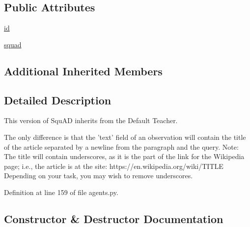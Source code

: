 \subsection*{Public Attributes}
\begin{DoxyCompactItemize}
\item 
\hyperlink{classparlai_1_1tasks_1_1squad2_1_1agents_1_1TitleTeacher_a7c29404ea09cd71791d48377d35d8e6d}{id}
\item 
\hyperlink{classparlai_1_1tasks_1_1squad2_1_1agents_1_1TitleTeacher_a192c7e24f0159dcb8c512526e7f8a1fb}{squad}
\end{DoxyCompactItemize}
\subsection*{Additional Inherited Members}


\subsection{Detailed Description}
\begin{DoxyVerb}This version of SquAD inherits from the Default Teacher.

The only
difference is that the 'text' field of an observation will contain
the title of the article separated by a newline from the paragraph and the
query.
Note: The title will contain underscores, as it is the part of the link for
the Wikipedia page; i.e., the article is at the site:
https://en.wikipedia.org/wiki/{TITLE}
Depending on your task, you may wish to remove underscores.
\end{DoxyVerb}
 

Definition at line 159 of file agents.\+py.



\subsection{Constructor \& Destructor Documentation}
\mbox{\label{classparlai_1_1tasks_1_1squad2_1_1agents_1_1TitleTeacher_ad0306665ca749e4b3bb3835d81e3e26b}} 
